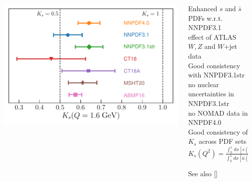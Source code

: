 \documentclass{beamer}
\begin{document}
\begin{frame}
\begin{columns}[c]
\begin{column}{0.5\textwidth}
   \includegraphics[width=\columnwidth]{plots/ks-Q_1p6GeV}\\
  \end{column}
  \begin{column}{0.5\textwidth}
   \centering
   \footnotesize
   Enhanced $s$ and $\bar{s}$ PDFs w.r.t. NNPDF3.1\\
   {\scriptsize effect of ATLAS $W,Z$ and $W$+jet data}\\
   \vspace{0.2cm}
   Good consistency with NNPDF3.1str\\
   {\scriptsize no nuclear uncertainties in NNPDF3.1str}\\
   {\scriptsize no NOMAD data in NNPDF4.0}\\
   \vspace{0.2cm}
   Good consistency of $K_s$ across PDF sets\\ 
   \vspace{0.1cm}
   $K_s(Q^2)=\frac{\int_0^1\,dx[s(x,Q^2)+\bar{s}(x,Q^2)]}{\int_0^1\,dx[\bar{u}(x,Q^2)+\bar{d}(x,Q^2)]}$\\
   \begin{flushright}
    {\tiny{See also [{\color{salmon}{EPJ\,C80\,(2020)\,1168}}]}}
   \end{flushright}
  \end{column}
 \end{columns} 
\end{frame}
\end{document}
